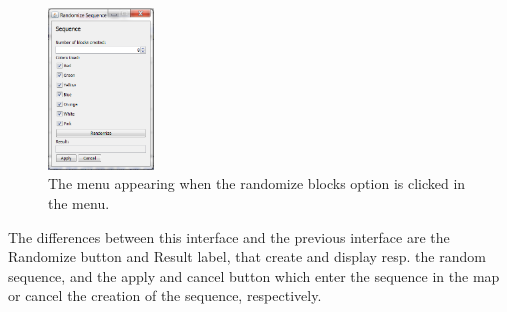 \begin{figure}[h!]
	\center
	\includegraphics[width=0.25\textwidth]{EnvironmentStore/MenuSeq.png}
	\caption{The menu appearing when the randomize blocks option is clicked in the menu.}
	\label{fig:MenuSeq}
\end{figure}

The differences between this interface and the previous interface are the Randomize button and Result label, that  create and display resp. the random sequence, and the apply and cancel button which enter the sequence in the map or cancel the creation of the sequence, respectively.


